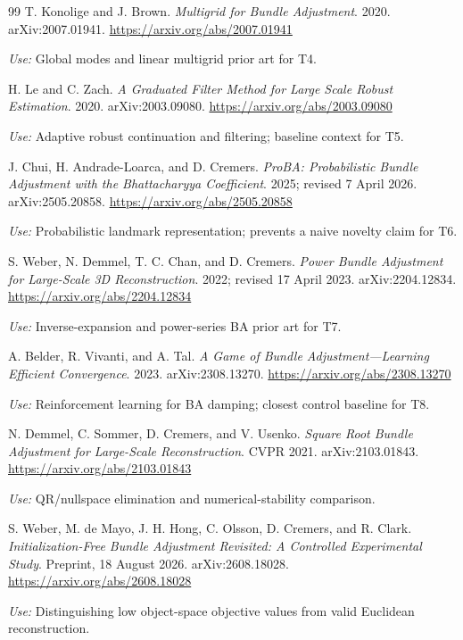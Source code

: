 \documentclass[11pt,a4paper]{article}
\begin{document}
\begin{thebibliography}{99}
T. Konolige and J. Brown.
\emph{Multigrid for Bundle Adjustment}.
2020. arXiv:2007.01941.
\url{https://arxiv.org/abs/2007.01941}\par
\textit{Use:} Global modes and linear multigrid prior art for T4.

H. Le and C. Zach.
\emph{A Graduated Filter Method for Large Scale Robust Estimation}.
2020. arXiv:2003.09080.
\url{https://arxiv.org/abs/2003.09080}\par
\textit{Use:} Adaptive robust continuation and filtering; baseline context for T5.

J. Chui, H. Andrade-Loarca, and D. Cremers.
\emph{ProBA: Probabilistic Bundle Adjustment with the Bhattacharyya Coefficient}.
2025; revised 7 April 2026. arXiv:2505.20858.
\url{https://arxiv.org/abs/2505.20858}\par
\textit{Use:} Probabilistic landmark representation; prevents a naive novelty claim for T6.

S. Weber, N. Demmel, T. C. Chan, and D. Cremers.
\emph{Power Bundle Adjustment for Large-Scale 3D Reconstruction}.
2022; revised 17 April 2023. arXiv:2204.12834.
\url{https://arxiv.org/abs/2204.12834}\par
\textit{Use:} Inverse-expansion and power-series BA prior art for T7.

A. Belder, R. Vivanti, and A. Tal.
\emph{A Game of Bundle Adjustment---Learning Efficient Convergence}.
2023. arXiv:2308.13270.
\url{https://arxiv.org/abs/2308.13270}\par
\textit{Use:} Reinforcement learning for BA damping; closest control baseline for T8.

N. Demmel, C. Sommer, D. Cremers, and V. Usenko.
\emph{Square Root Bundle Adjustment for Large-Scale Reconstruction}.
CVPR 2021. arXiv:2103.01843.
\url{https://arxiv.org/abs/2103.01843}\par
\textit{Use:} QR/nullspace elimination and numerical-stability comparison.

S. Weber, M. de Mayo, J. H. Hong, C. Olsson, D. Cremers, and R. Clark.
\emph{Initialization-Free Bundle Adjustment Revisited: A Controlled Experimental Study}.
Preprint, 18 August 2026. arXiv:2608.18028.
\url{https://arxiv.org/abs/2608.18028}\par
\textit{Use:} Distinguishing low object-space objective values from valid Euclidean reconstruction.
\end{thebibliography}
\end{document}
